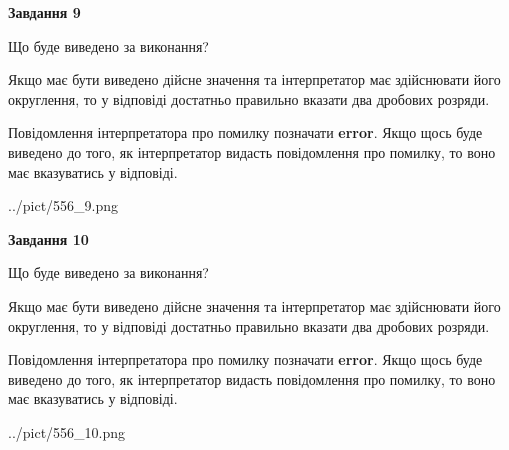 \documentclass[12pt, ukrainian]{article}
\begin{document}
{\begin {Large}
{\begin {center}\textbf{Завдання 9}\end {center}}\par
Що буде виведено за виконання? \par

Якщо має бути виведено дійсне значення та інтерпретатор має здійснювати його округлення, 
то у відповіді достатньо правильно вказати два дробових розряди.

Повідомлення інтерпретатора про помилку позначати \textbf{error}.
Якщо щось буде виведено до того, як інтерпретатор видасть повідомлення про помилку, 
то воно має вказуватись у відповіді. \par

\begin{center}
	{../pict/556_9.png}
\end{center}
\newpage

{\begin {center}\textbf{Завдання 10}\end {center}}\par
Що буде виведено за виконання? \par

Якщо має бути виведено дійсне значення та інтерпретатор має здійснювати його округлення, 
то у відповіді достатньо правильно вказати два дробових розряди.

Повідомлення інтерпретатора про помилку позначати \textbf{error}.
Якщо щось буде виведено до того, як інтерпретатор видасть повідомлення про помилку, 
то воно має вказуватись у відповіді. \par

\begin{center}
	{../pict/556_10.png}
\end{center}
\newpage

\end {Large}}
\end{document}
